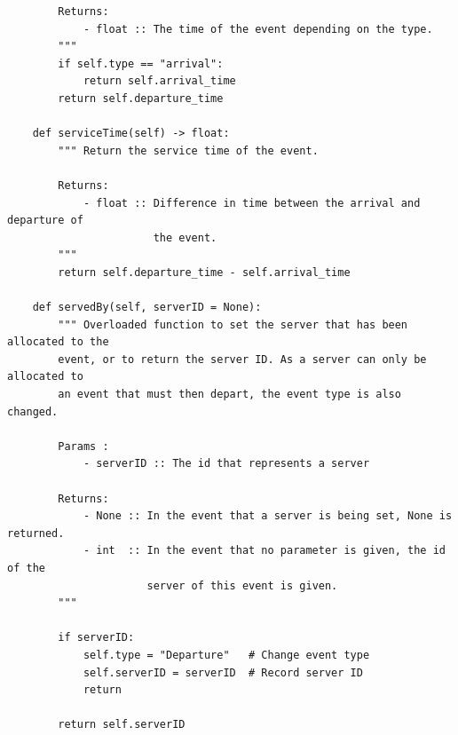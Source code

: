 \documentclass{ecmm427_assignment}
\begin{document}
\begin{verbatim}
        Returns:
            - float :: The time of the event depending on the type.
        """
        if self.type == "arrival":
            return self.arrival_time
        return self.departure_time

    def serviceTime(self) -> float:
        """ Return the service time of the event. 
        
        Returns:
            - float :: Difference in time between the arrival and departure of 
                       the event.
        """
        return self.departure_time - self.arrival_time

    def servedBy(self, serverID = None):
        """ Overloaded function to set the server that has been allocated to the
        event, or to return the server ID. As a server can only be allocated to 
        an event that must then depart, the event type is also changed.

        Params :
            - serverID :: The id that represents a server

        Returns:
            - None :: In the event that a server is being set, None is returned.
            - int  :: In the event that no parameter is given, the id of the
                      server of this event is given.
        """

        if serverID:
            self.type = "Departure"   # Change event type
            self.serverID = serverID  # Record server ID
            return

        return self.serverID
\end{verbatim}
\end{document}
